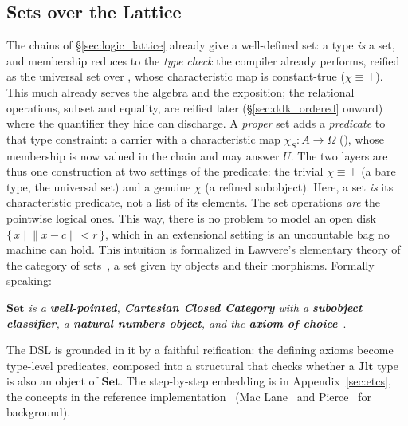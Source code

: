 \documentclass[11pt, a4paper]{article}
\begin{document}
\subsection{Sets over the Lattice}
\label{sec:reification_set}
The chains of §\ref{sec:logic_lattice} already give a well-defined set: a type \emph{is} a set, and membership reduces to the \emph{type check} the compiler already performs, reified as the universal set  over , whose characteristic map is constant-true ($\chi \equiv \top$).
This much already serves the algebra and the exposition; the relational operations, subset and equality, are reified later (§\ref{sec:ddk_ordered} onward) where the quantifier they hide can discharge.
A \emph{proper} set adds a \emph{predicate} to that type constraint: a carrier  with a characteristic map $\chi_S : A \to \Omega$ (), whose membership is now valued in the chain and may answer $U$.
The two layers are thus one construction at two settings of the predicate: the trivial $\chi \equiv \top$ (a bare type, the universal set) and a genuine $\chi$ (a refined subobject).
Here, a set \emph{is} its characteristic predicate, not a list of its elements.
The set operations \emph{are} the pointwise logical ones.
This way, there is no problem to model an open disk $\{\, x \mid \lVert x - c \rVert < r \,\}$, which in an extensional setting is an uncountable bag no machine can hold.
This intuition is formalized in Lawvere's elementary theory of the category of sets~\cite{lawvere1964etcs}, a set given by objects and their morphisms.
Formally speaking:
\begin{definition}
\label{def:etcs-set}
\emph{$\mathbf{Set}$ is a \textbf{well-pointed}, \textbf{Cartesian Closed Category} with a \textbf{subobject classifier}, a \textbf{natural numbers object}, and the \textbf{axiom of choice}}~\cite{nlab:nlab}.
\end{definition}
The DSL is grounded in it by a faithful reification: the defining axioms become type-level  predicates, composed into a structural  that checks whether a $\mathbf{Jlt}$ type is also an object of $\mathbf{Set}$.
The step-by-step embedding is in Appendix~\ref{sec:etcs}, the concepts in the reference implementation~\cite{Krautler_dedekind_2026} (Mac Lane~\cite{maclane1971categories} and Pierce~\cite{pierce1991basic} for background).
\end{document}
